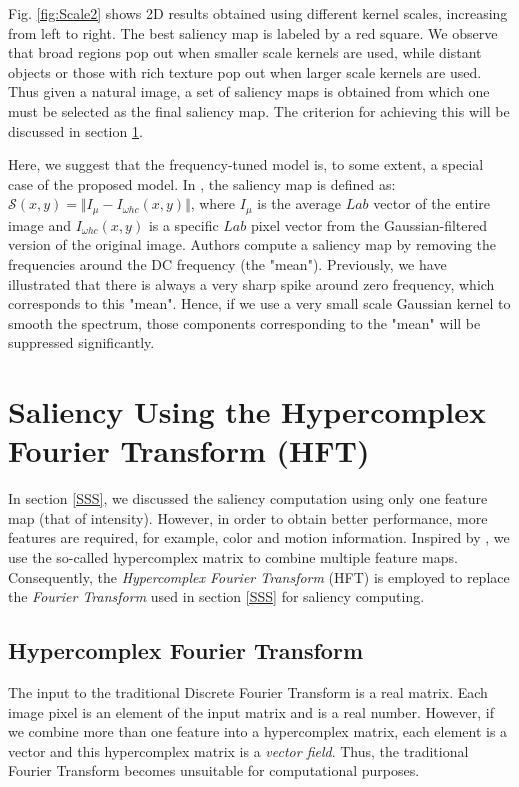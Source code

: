 \documentclass[10pt,journal,cspaper,compsoc]{IEEEtran}
\begin{document}
Fig. \ref{fig:Scale2} shows 2D results obtained using  different kernel scales, increasing from left to right. The best saliency map is labeled by a red square. We observe that broad regions pop out when smaller scale kernels are used, while distant objects or those with rich texture pop out when larger scale kernels are used. Thus given a natural image, a set of saliency maps is obtained from which one must be selected as the final saliency map. The criterion for achieving this will be discussed in section \ref{sM:HFT}.

Here, we suggest that the frequency-tuned model \cite{LCAV-CONF-2009-012} is, to some extent, a special case of the proposed model. In \cite{LCAV-CONF-2009-012}, the saliency map is defined as:
${\mathcal{S}}(x,y)=\Vert I_{\mu}-I_{\omega hc}(x,y)\Vert$,
where $I_{\mu}$ is the average $Lab$ vector of the entire image and $I_{\omega hc}(x,y)$ is a specific $Lab$ pixel vector from the Gaussian-filtered version of the original image. Authors compute a saliency map by removing the frequencies around the DC frequency (the {"}mean{"}). Previously, we have illustrated that there is always a very sharp spike around zero frequency, which corresponds to this {"}mean{"}. Hence, if we use a very small scale Gaussian kernel to smooth the spectrum, those components corresponding to the {"}mean{"} will be suppressed significantly.

\section{Saliency Using the  Hypercomplex Fourier Transform (HFT)}
\label{sM:HFT}

In section \ref{SSS}, we discussed the saliency computation using only one feature map (that of intensity). However, in order to obtain better performance, more features are required, for example, color and motion information. Inspired by \cite{guo2008spatio, ell2002quaternion, ell2006hypercomplex}, we use the so-called hypercomplex matrix to combine multiple feature maps. Consequently, the {\it Hypercomplex Fourier Transform} (HFT) is employed to replace the {\it Fourier Transform} used in section \ref{SSS} for saliency computing.

\subsection{Hypercomplex Fourier Transform}

The input to the traditional Discrete Fourier Transform is a real matrix. Each image pixel is an element of the input matrix and is a real number. However, if we combine more than one feature into a hypercomplex matrix, each element is a vector and this hypercomplex matrix is a {\it vector field}. Thus, the traditional Fourier Transform becomes unsuitable for computational purposes.
\end{document}
